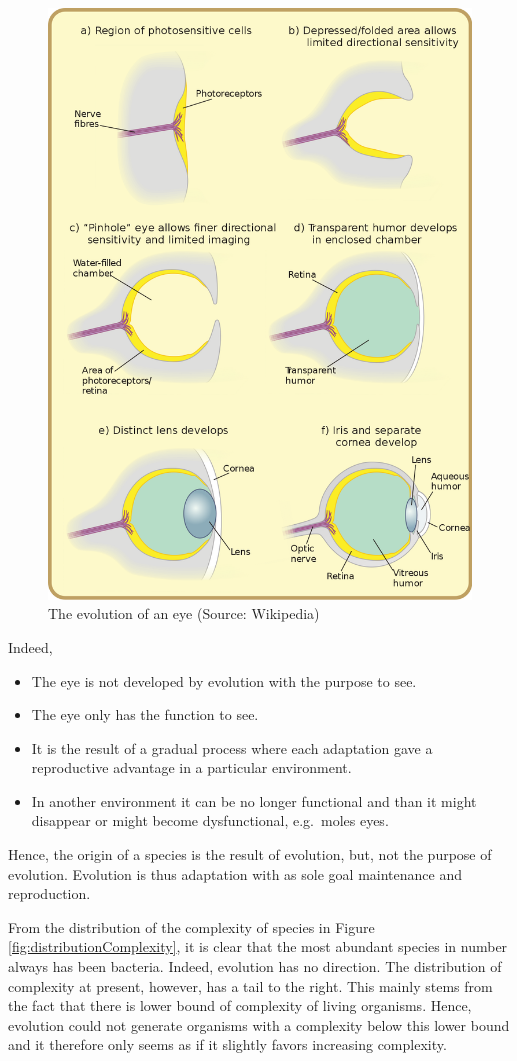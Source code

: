 \documentclass[
  11pt,
]{book}
\begin{document}
\begin{figure}

{\centering \includegraphics[width=0.45\linewidth]{./figs/evolutionEye} 

}

\caption{The evolution of an eye (Source: Wikipedia)}\label{fig:evolutionEye}
\end{figure}

Indeed,

\begin{itemize}
\item
  The eye is not developed by evolution with the purpose to see.
\item
  The eye only has the function to see.
\item
  It is the result of a gradual process where each adaptation gave a reproductive advantage in a particular environment.
\item
  In another environment it can be no longer functional and than it might disappear or might become dysfunctional, e.g.~moles eyes.
\end{itemize}

Hence, the origin of a species is the result of evolution, but, not the purpose of evolution. Evolution is thus adaptation with as sole goal maintenance and reproduction.

From the distribution of the complexity of species in Figure \ref{fig:distributionComplexity}, it is clear that the most abundant species in number always has been bacteria.
Indeed, evolution has no direction.
The distribution of complexity at present, however, has a tail to the right.
This mainly stems from the fact that there is lower bound of complexity of living organisms. Hence, evolution could not generate organisms with a complexity below this lower bound and it therefore only seems as if it slightly favors increasing complexity.
\end{document}
